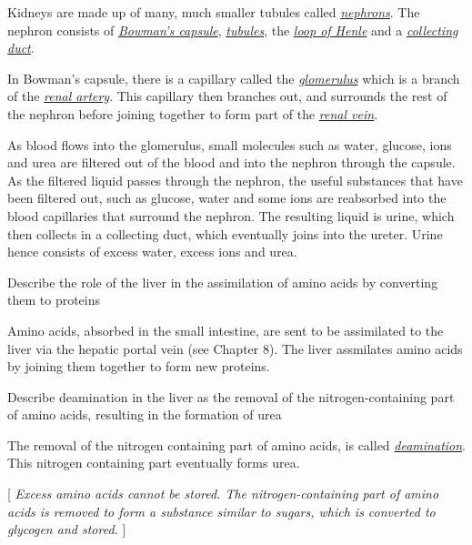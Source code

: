 Kidneys are made up of many, much smaller tubules called \underline{\emph{nephrons}}. The
nephron consists of \underline{\emph{Bowman's capsule}}, \underline{\emph{tubules}}, the
\underline{\emph{loop of Henle}} and a \underline{\emph{collecting duct}}. 

\smallskip
In Bowman's capsule, there is a capillary called the \underline{\emph{glomerulus}} which is
a branch of the \underline{\emph{renal artery}}. This
capillary then branches out, and surrounds the rest of the nephron before joining together to
form part of the \underline{\emph{renal vein}}.

As blood flows into the glomerulus, small molecules such as water, glucose, ions and urea are 
filtered out of the blood and into the nephron through the capsule. As the filtered liquid passes
through the nephron, the useful substances that have been filtered out, such as glucose, water and
some ions are reabsorbed into the blood capillaries that surround the nephron. The resulting
liquid is urine, which then collects in a collecting duct, which eventually joins into the ureter.
Urine hence consists of excess water, excess ions and urea.

\begin{point}
Describe the role of the liver in the assimilation of amino acids by converting them to proteins
\end{point}

Amino acids, absorbed in the small intestine, are sent to be assimilated to the liver via the
hepatic portal vein (see Chapter 8). The liver assmilates amino acids by joining them together to
form new proteins.

\begin{point}
Describe deamination in the liver as the removal of the nitrogen-containing part of amino acids, resulting 
in the formation of urea
\end{point}
The removal of the nitrogen containing part of amino acids, is called 
\underline{\emph{deamination}}. This nitrogen containing part eventually forms urea.

[ \emph{Excess amino acids cannot be stored. The nitrogen-containing part of amino acids is removed to
form a substance similar to sugars, which is converted to glycogen and stored.} ]
